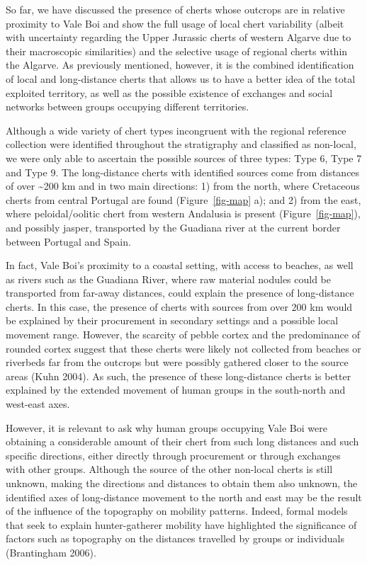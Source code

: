 \documentclass[
  a4paper,
  DIV=11,
  numbers=noendperiod]{scrreprt}
\begin{document}
So far, we have discussed the presence of cherts whose outcrops are in
relative proximity to Vale Boi and show the full usage of local chert
variability (albeit with uncertainty regarding the Upper Jurassic cherts
of western Algarve due to their macroscopic similarities) and the
selective usage of regional cherts within the Algarve. As previously
mentioned, however, it is the combined identification of local and
long-distance cherts that allows us to have a better idea of the total
exploited territory, as well as the possible existence of exchanges and
social networks between groups occupying different territories.

Although a wide variety of chert types incongruent with the regional
reference collection were identified throughout the stratigraphy and
classified as non-local, we were only able to ascertain the possible
sources of three types: Type 6, Type 7 and Type 9. The long-distance
cherts with identified sources come from distances of over
\textasciitilde200 km and in two main directions: 1) from the north,
where Cretaceous cherts from central Portugal are found
(Figure~\ref{fig-map} a); and 2) from the east, where peloidal/oolitic
chert from western Andalusia is present (Figure~\ref{fig-map}), and
possibly jasper, transported by the Guadiana river at the current border
between Portugal and Spain.

In fact, Vale Boi's proximity to a coastal setting, with access to
beaches, as well as rivers such as the Guadiana River, where raw
material nodules could be transported from far-away distances, could
explain the presence of long-distance cherts. In this case, the presence
of cherts with sources from over 200 km would be explained by their
procurement in secondary settings and a possible local movement range.
However, the scarcity of pebble cortex and the predominance of rounded
cortex suggest that these cherts were likely not collected from beaches
or riverbeds far from the outcrops but were possibly gathered closer to
the source areas (Kuhn 2004). As such, the presence of these
long-distance cherts is better explained by the extended movement of
human groups in the south-north and west-east axes.

However, it is relevant to ask why human groups occupying Vale Boi were
obtaining a considerable amount of their chert from such long distances
and such specific directions, either directly through procurement or
through exchanges with other groups. Although the source of the other
non-local cherts is still unknown, making the directions and distances
to obtain them also unknown, the identified axes of long-distance
movement to the north and east may be the result of the influence of the
topography on mobility patterns. Indeed, formal models that seek to
explain hunter-gatherer mobility have highlighted the significance of
factors such as topography on the distances travelled by groups or
individuals (Brantingham 2006).
\end{document}
